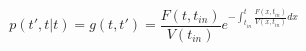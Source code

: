 \begin{equation}
p(t',t|t)=g(t,t')= \frac{F(t,t_{in})}{V(t_{in})} e^{-\int_{t_{in}}^t \frac{F(x,t_{in})}{V(x,t_{in})} dx}
\end{equation}